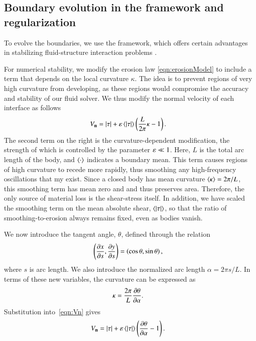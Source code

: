 \documentclass[preprint, 10pt]{elsarticle}
\begin{document}
\subsection{Boundary evolution in the {\thL} framework and regularization} 
\label{sec:thetaL}

To evolve the boundaries, we use the {\thL} framework, which offers certain advantages in stabilizing fluid-structure interaction problems \cite{hou-low-she1994}.

For numerical stability, we modify the erosion law \eqref{eqn:erosionModel} to include a term that depends on the local curvature $\kappa$. The idea is to prevent regions of very high
curvature from developing, as these regions would compromise the accuracy and stability of our fluid solver. We thus modify the normal velocity of each interface as follows
\begin{align}
  \label{eqn:Vn}
  V_{\mathbf{n}} = \lvert \tau \rvert + \varepsilon \left< \lvert \tau \rvert \right> \left( \frac{L }{2\pi} \kappa - 1
  \right).
\end{align}
The second term on the right is the curvature-dependent modification, the strength of which is controlled by the parameter $\varepsilon \ll 1$. Here, $L$ is the total arc length of the body, and $\left< \cdot \right>$ indicates a boundary mean. This term causes regions of high curvature to recede more rapidly, thus smoothing any high-frequency oscillations that my exist. Since a closed body has mean curvature $\left< \kappa \right> = 2\pi / L$, this smoothing term has mean zero and and thus preserves area. Therefore, the only source of material loss is the shear-stress itself. In addition, we have scaled the smoothing term on the mean absolute shear, $\left< \lvert \tau \rvert \right>$, so that the ratio of smoothing-to-erosion always remains fixed, even as bodies vanish.

We now introduce the tangent angle, $\theta$, defined through the relation
\begin{align*}
\left( \frac{\partial x}{\partial s}, \frac{\partial y}{\partial s} \right) = \left(\cos \theta, \sin
\theta \right),
\end{align*}
where $s$ is arc length. We also introduce the normalized arc length $\alpha = 2 \pi s / L$. In terms of these new variables, the curvature can be expressed as
\begin{align*}
\kappa = \frac{2 \pi}{L} \frac{\partial \theta}{\partial \alpha}.
\end{align*}
Substitution into~\eqref{eqn:Vn} gives
\begin{align}
\label{eqn:Vn2}
V_{\mathbf{n}} = \lvert \tau \rvert +  \varepsilon \left< \lvert \tau \rvert \right>   \left(\frac{\partial \theta}{\partial \alpha} - 1
\right).
\end{align}
\end{document}
